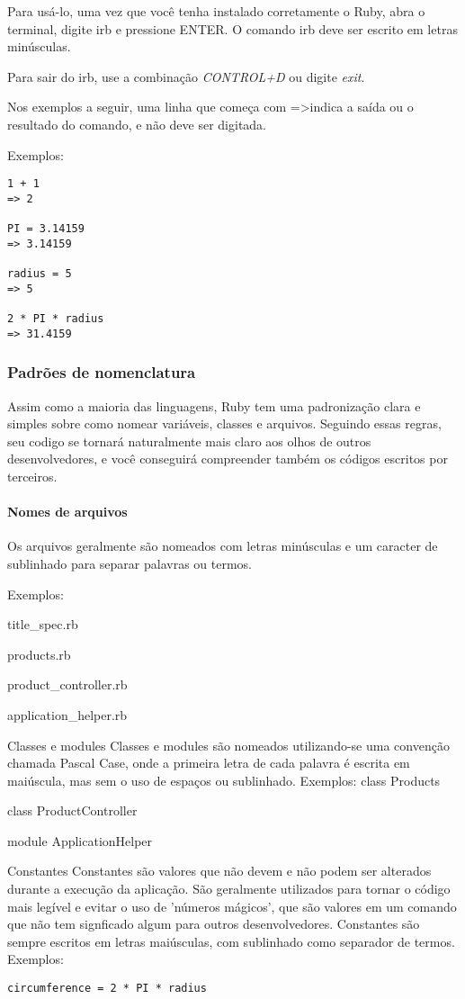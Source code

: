 \documentclass[12pt]{book} %
\begin{document}
Para usá-lo, uma vez que você tenha instalado corretamente o Ruby, abra o terminal, digite irb e pressione ENTER. O comando irb deve ser escrito em letras minúsculas.

Para sair do irb, use a combinação \emph{CONTROL+D} ou digite \emph{exit}.

Nos exemplos a seguir, uma linha que começa com =\textgreater indica a saída ou o resultado do comando, e não deve ser digitada.

Exemplos:

\begin{lstlisting}
1 + 1
=> 2

PI = 3.14159
=> 3.14159

radius = 5
=> 5

2 * PI * radius
=> 31.4159
\end{lstlisting}
 
\subsubsection{Padrões de nomenclatura}
Assim como a maioria das linguagens, Ruby tem uma padronização clara e simples sobre como nomear variáveis, classes e arquivos. Seguindo essas regras, seu codigo se tornará naturalmente mais claro aos olhos de outros desenvolvedores, e você conseguirá compreender também os códigos escritos por terceiros.

\paragraph{Nomes de arquivos}
Os arquivos geralmente são nomeados com letras minúsculas e um caracter de sublinhado para separar palavras ou termos.

Exemplos:

title\_spec.rb

products.rb

product\_controller.rb

application\_helper.rb

Classes e modules
Classes e modules são nomeados utilizando-se uma convenção chamada Pascal Case, onde a primeira letra de cada palavra é escrita em maiúscula, mas sem o uso de espaços ou sublinhado.  
Exemplos:
class Products

class ProductController

module ApplicationHelper

Constantes
Constantes são valores que não devem e não podem ser alterados durante a execução da aplicação. São geralmente utilizados para tornar o código mais legível e evitar o uso de 'números mágicos', que são valores em um comando que não tem signficado algum para outros desenvolvedores.
Constantes são sempre escritos em letras maiúsculas, com sublinhado como separador de termos.
Exemplos:
\begin{lstlisting}
circumference = 2 * PI * radius
\end{lstlisting}
\end{document}
